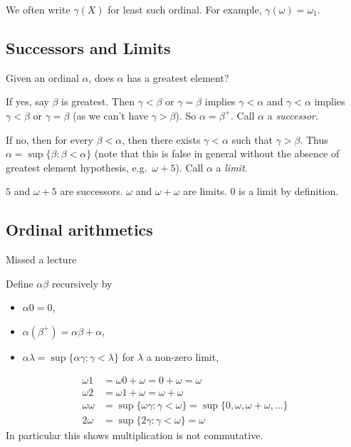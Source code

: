 \documentclass[a4paper]{article}
\begin{document}
\begin{notation}
  We often write \(\gamma(X)\) for least such ordinal. For example, \(\gamma(\omega) = \omega_1\).
\end{notation}

\subsection{Successors and Limits}

Given an ordinal \(\alpha\), does \(\alpha\) has a greatest element?

If yes, say \(\beta\) is greatest. Then \(\gamma < \beta\) or \(\gamma = \beta\) implies \(\gamma < \alpha\) and \(\gamma < \alpha\) implies \(\gamma < \beta\) or \(\gamma = \beta\) (as we can't have \(\gamma > \beta\)). So \(\alpha = \beta^+\). Call \(\alpha\) a \emph{successor}.

If no, then for every \(\beta < \alpha\), then there exists \(\gamma < \alpha\) such that \(\gamma > \beta\). Thus \(\alpha = \sup\{\beta: \beta < \alpha\}\) (note that this is false in general without the absence of greatest element hypothesis, e.g.\ \(\omega + 5\)). Call \(\alpha\) a \emph{limit}.

\begin{eg}
  \(5\) and \(\omega + 5\) are successors. \(\omega\) and \(\omega + \omega\) are limits. \(0\) is a limit by definition.
\end{eg}

\subsection{Ordinal arithmetics}

Missed a lecture

\blindtext

\begin{definition}
  Define \(\alpha\beta\) recursively by
  \begin{itemize}
  \item \(\alpha 0 = 0\),
  \item \(\alpha(\beta^+) = \alpha\beta + \alpha\),
  \item \(\alpha\lambda = \sup\{\alpha\gamma: \gamma < \lambda\}\) for \(\lambda\) a non-zero limit,
  \end{itemize}
\end{definition}

\begin{eg}
  \begin{align*}
    \omega 1 &= \omega 0 + \omega = 0 + \omega = \omega \\
    \omega 2 &= \omega 1 + \omega = \omega + \omega \\
    \omega\omega &= \sup \{\omega\gamma: \gamma < \omega\} = \sup \{0, \omega, \omega + \omega, \dots\} \\
    2 \omega &= \sup \{2\gamma: \gamma < \omega\} = \omega
  \end{align*}
  In particular this shows multiplication is not commutative.
\end{eg}
\end{document}
